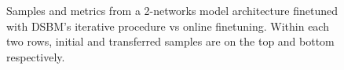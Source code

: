 \documentclass{article}
\begin{document}
\begin{figure}[htbp]
    \hfill
    \hfill
    
    
    \caption{Samples and metrics from a 2-networks model architecture finetuned with DSBM's iterative procedure vs online finetuning. Within each two rows, initial and transferred samples are on the top and bottom respectively. } 
    \label{fig:afhq64_dsbm_vs_online} 
\end{figure}
\end{document}
